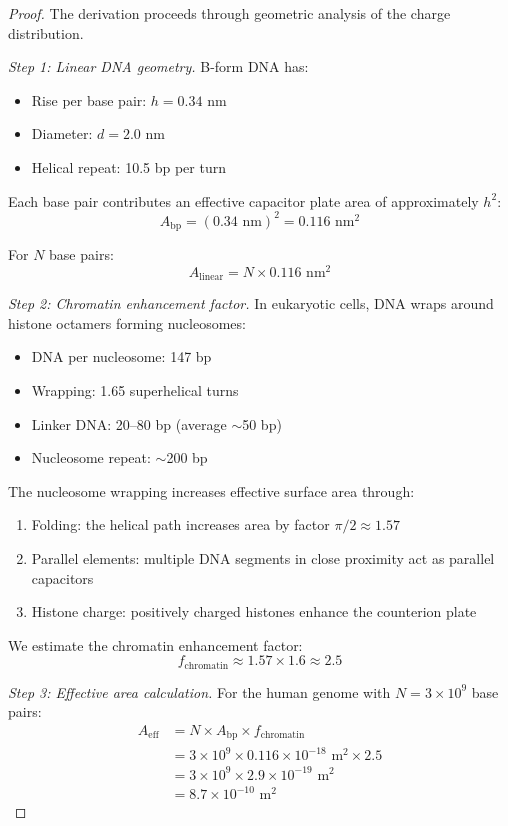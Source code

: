 \documentclass[twocolumn,10pt]{article}
\theoremstyle{remark}
\begin{document}
\begin{proof}
The derivation proceeds through geometric analysis of the charge distribution.

\textit{Step 1: Linear DNA geometry.} B-form DNA has:
\begin{itemize}
\item Rise per base pair: $h = 0.34$ nm
\item Diameter: $d = 2.0$ nm
\item Helical repeat: 10.5 bp per turn
\end{itemize}

Each base pair contributes an effective capacitor plate area of approximately $h^2$:
\begin{equation}
A_{\mathrm{bp}} = (0.34 \text{ nm})^2 = 0.116 \text{ nm}^2
\end{equation}

For $N$ base pairs:
\begin{equation}
A_{\mathrm{linear}} = N \times 0.116 \text{ nm}^2
\end{equation}

\textit{Step 2: Chromatin enhancement factor.} In eukaryotic cells, DNA wraps around histone octamers forming nucleosomes:
\begin{itemize}
\item DNA per nucleosome: 147 bp
\item Wrapping: 1.65 superhelical turns
\item Linker DNA: 20--80 bp (average $\sim$50 bp)
\item Nucleosome repeat: $\sim$200 bp
\end{itemize}

The nucleosome wrapping increases effective surface area through:
\begin{enumerate}
\item Folding: the helical path increases area by factor $\pi/2 \approx 1.57$
\item Parallel elements: multiple DNA segments in close proximity act as parallel capacitors
\item Histone charge: positively charged histones enhance the counterion plate
\end{enumerate}

We estimate the chromatin enhancement factor:
\begin{equation}
f_{\mathrm{chromatin}} \approx 1.57 \times 1.6 \approx 2.5
\end{equation}

\textit{Step 3: Effective area calculation.} For the human genome with $N = 3 \times 10^9$ base pairs:
\begin{align}
A_{\mathrm{eff}} &= N \times A_{\mathrm{bp}} \times f_{\mathrm{chromatin}} \\
&= 3 \times 10^9 \times 0.116 \times 10^{-18} \text{ m}^2 \times 2.5 \\
&= 3 \times 10^9 \times 2.9 \times 10^{-19} \text{ m}^2 \\
&= 8.7 \times 10^{-10} \text{ m}^2
\end{align}


\end{proof}
\end{document}
